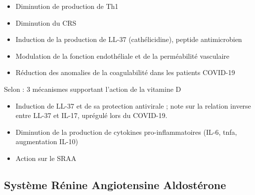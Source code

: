 \documentclass[
  a4paper,
  DIV=11,
  numbers=noendperiod,
  listof=totoc]{scrreprt}
\providecommand{\tightlist}{%
  \setlength{\itemsep}{0pt}\setlength{\parskip}{0pt}}\usepackage{longtable,booktabs,array}
\begin{document}
\begin{itemize}
\tightlist
\item
  Diminution de production de Th1
\item
  Diminution du \ac{CRS}
\item
  Induction de la production de LL-37 (cathélicidine), peptide
  antimicrobien
\item
  Modulation de la fonction endothéliale et de la perméabilité
  vasculaire
\item
  Réduction des anomalies de la coagulabilité dans les patients COVID-19
\end{itemize}

Selon \textcite{Pal.2022} : 3 mécanismes supportant l'action de la
vitamine D

\begin{itemize}
\tightlist
\item
  Induction de LL-37 et de sa protection antivirale ; note sur la
  relation inverse entre LL-37 et IL-17, uprégulé lors du COVID-19.
\item
  Diminution de la production de cytokines pro-inflammatoires
  (\ac{IL-6}, \ac{tnfa}, augmentation \ac{IL-10})
\item
  Action sur le \ac{SRAA}
\end{itemize}

\subsection{Système Rénine Angiotensine
Aldostérone}\label{systuxe8me-ruxe9nine-angiotensine-aldostuxe9rone}
\end{document}

